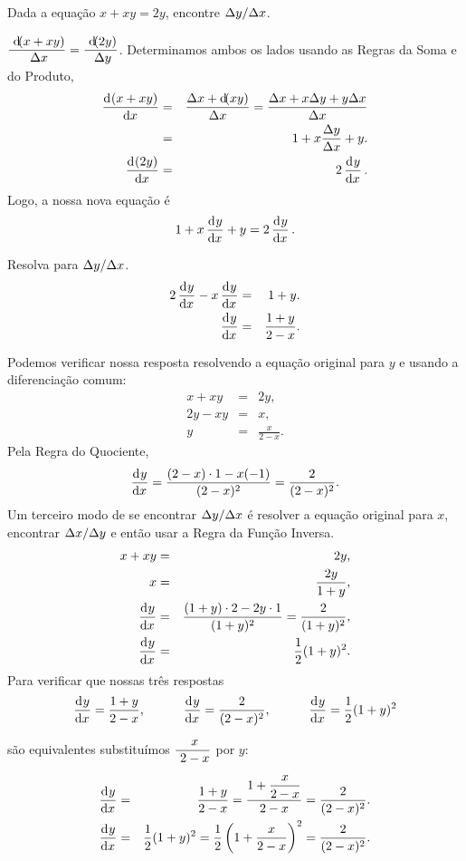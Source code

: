 \begin{example}\label{ex:cap2p8ex1}
Dada a equação $x + xy = 2y$, encontre $\Delta{y}/\Delta{x}$.
\begin{stepanalysis}
\item $\dsfrac{\dif(x + xy)}{\dx} = \dsfrac{\dif(2y)}{\dy}$. Determinamos
ambos os lados usando as Regras da Soma e do Produto,
\begin{eqnarray*}
  \dod{(x + xy)}{x} & = & \frac{\dx + \dif(xy)}{\dx} =
    \frac{\dx + x \dy + y \dx}{\dx} \\
  & = & 1 + x \frac{\dy}{\dx} + y. \\
  \dod{(2y)}{x} & = & 2 \dod y x.
\end{eqnarray*}
Logo, a nossa nova equação é
$$
  1 + x \dod y x  + y = 2 \dod y x.
$$
\item Resolva para $\Delta{y}/\Delta{x}$.
\begin{eqnarray*}
  2 \dod y x - x \dod y x & = & 1 + y. \\
  \dod y x & = & \frac{1 + y}{2 - x}.
\end{eqnarray*}
\end{stepanalysis}
Podemos verificar nossa resposta resolvendo a equação original para $y$
e usando a diferenciação comum:
\begin{eqnarray*}
  x + xy & = & 2y, \\
  2y - xy & = & x, \\
  y & = & \frac{x}{2-x}.
\end{eqnarray*}
Pela Regra do Quociente,
$$
  \dod y x = \frac{(2-x)\cdot 1 - x (-1)}{(2-x)^2} = \frac{2}{(2-x)^2}.
$$
Um terceiro modo de se encontrar $\Delta{y}/\Delta{x}$ é resolver a equação original para
$x$, encontrar $\Delta{x}/\Delta{y}$ e então usar a Regra da Função Inversa.
\begin{eqnarray*}
  x + xy & = & 2y, \\
  x & = & \frac{2y}{1 + y}, \\
  \dod y x & = & \frac{(1+y)\cdot2 - 2y \cdot 1}{(1 + y)^2} = \frac{2}{(1+y)^2},\\
  \dod y x & = & \frac{1}{2}(1+y)^2.
\end{eqnarray*}
Para verificar que nossas três respostas
$$
  \dod y x = \frac{1+y}{2-x}, \hspace{3em}
  \dod y x = \frac{2}{(2-x)^2}, \hspace{3em}
  \dod y x = \frac{1}{2}(1+y)^2
$$
são equivalentes substituímos $\dsfrac{x}{2-x}$ por $y$:
\begin{eqnarray*}
  \dod y x & = & \frac{1+y}{2-x} = \frac{1 + \dfrac{x}{2-x}}{2-x} = \frac{2}{(2-x)^2}. \\
  \dod y x & = & \frac{1}{2}(1+y)^2 = \frac{1}{2}\left(1 + \frac{x}{2-x}\right)^2 = \frac{2}{(2-x)^2}.
\end{eqnarray*}
\end{example}


